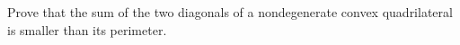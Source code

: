 Prove that the sum of the two diagonals of a nondegenerate convex quadrilateral is smaller than its perimeter.
